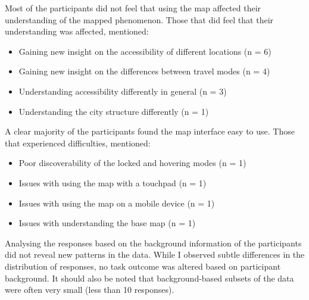 Most of the participants did not feel that using the map affected
their understanding of the mapped phenomenon.
Those that did feel that their understanding was affected, mentioned:
\begin{itemize}
	\item Gaining new insight on the accessibility of different locations (n = 6)
	\item Gaining new insight on the differences between travel modes (n = 4)
	\item Understanding accessibility differently in general (n = 3)
	\item Understanding the city structure differently (n = 1)
\end{itemize}

A clear majority of the participants found the map interface easy to use.
Those that experienced difficulties, mentioned:
\begin{itemize}
	\item Poor discoverability of the locked and hovering modes (n = 1)
	\item Issues with using the map with a touchpad (n = 1)
	\item Issues with using the map on a mobile device (n = 1)
	\item Issues with understanding the base map (n = 1)
\end{itemize}

Analysing the responses based on the background information of the participants
did not reveal new patterns in the data.
While I observed subtle differences in the distribution of responses,
no task outcome was altered based on participant background.
It should also be noted that
background-based subsets of the data were often very small (less than 10 responses).
